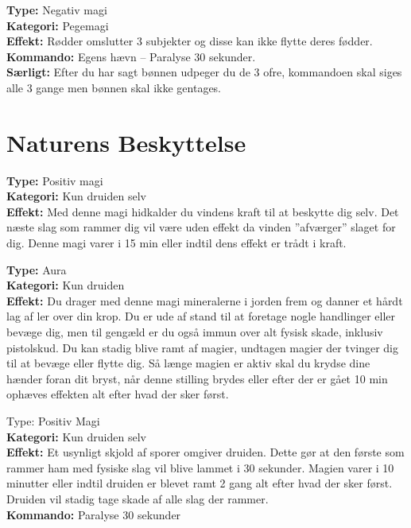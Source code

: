 \begin{jord*}
\textbf{Type:} Negativ magi\\ 
\textbf{Kategori:} Pegemagi\\
\textbf{Effekt:} Rødder omslutter 3 subjekter og disse kan ikke flytte deres fødder.\\
\textbf{Kommando:} Egens hævn – Paralyse 30 sekunder.\\
\textbf{Særligt:} Efter du har sagt bønnen udpeger du de 3 ofre, kommandoen skal siges alle 3 gange men bønnen skal ikke gentages.
\end{jord*}
\newpage
\section{Naturens Beskyttelse}

\begin{nBeskyt*}
\textbf{Type:} Positiv magi\\ 
\textbf{Kategori:} Kun druiden selv\\
\textbf{Effekt:} Med denne magi hidkalder du vindens kraft til at beskytte dig selv. Det næste slag som rammer dig vil være uden effekt da vinden ”afværger” slaget for dig. Denne magi varer i 15 min eller indtil dens effekt er trådt i kraft.
\end{nBeskyt*}

\begin{nBeskyt*}[Lerform]
\textbf{Type:} Aura\\ 
\textbf{Kategori:} Kun druiden\\
\textbf{Effekt:} Du drager med denne magi mineralerne i jorden frem og danner et hårdt lag af ler over din krop. Du er ude af stand til at foretage nogle handlinger eller bevæge dig, men til gengæld er du også immun over
alt fysisk skade, inklusiv pistolskud. Du kan stadig blive ramt af magier, undtagen magier der tvinger dig til at bevæge eller flytte dig. Så længe magien er aktiv skal du krydse dine hænder foran dit bryst, når denne stilling brydes eller efter der er gået 10 min ophæves effekten alt efter hvad der sker først.
\end{nBeskyt*}

\begin{nBeskyt*}[Pollenskjold]
Type: Positiv Magi  \\
\textbf{Kategori:} Kun druiden selv\\
\textbf{Effekt:} Et usynligt skjold af sporer omgiver druiden. Dette gør at den første som rammer ham med fysiske slag vil blive lammet i 30 sekunder. Magien varer i 10 minutter eller indtil druiden er blevet ramt 2 gang alt efter hvad der sker først. Druiden vil stadig tage skade af alle slag der rammer.\\
\textbf{Kommando:} Paralyse 30 sekunder
\end{nBeskyt*}


